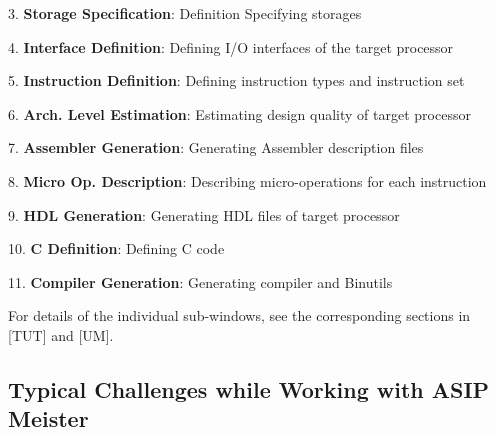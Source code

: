 \documentclass[
]{article}
\begin{document}
3. \textbf{Storage Specification}: Definition Specifying storages

4. \textbf{Interface Definition}: Defining I/O interfaces of the target
processor

5. \textbf{Instruction Definition}: Defining instruction types and
instruction set

6. \textbf{Arch. Level Estimation}: Estimating design quality of target
processor

7. \textbf{Assembler Generation}: Generating Assembler description files

8. \textbf{Micro Op. Description}: Describing micro-operations for each
instruction

9. \textbf{HDL Generation}: Generating HDL files of target processor

10. \textbf{C Definition}: Defining C code

11. \textbf{Compiler Generation}: Generating compiler and Binutils

For details of the individual sub-windows, see the corresponding
sections in {[}TUT{]} and {[}UM{]}.

\hypertarget{typical-challenges-while-working-with-asip-meister}{%
\subsection{Typical Challenges while Working with ASIP
Meister}\label{typical-challenges-while-working-with-asip-meister}}
\end{document}

